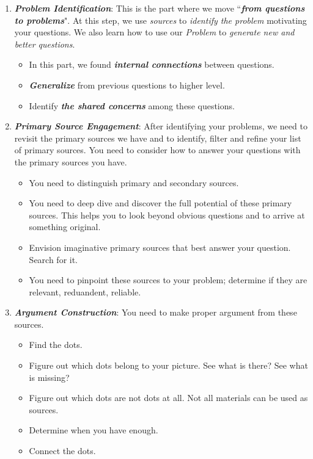 \documentclass[11pt]{article}
\begin{document}
\begin{itemize}
\begin{enumerate}
\item \emph{\textbf{Problem Identification}}: This is the part where we move ``\emph{\textbf{from questions to problems}}". At this step, we use \emph{sources} to \emph{identify the problem} motivating your questions. We also learn how to use our \emph{Problem} to \emph{generate new and better
questions}.
\begin{itemize}
\item In this part, we found \emph{\textbf{internal connections}} between questions. 

\item  \emph{\textbf{Generalize}} from previous questions to higher level.

\item Identify \emph{\textbf{the shared concerns}} among these questions.
\end{itemize}

\item \emph{\textbf{Primary Source Engagement}}: After identifying your problems, we need to revisit the primary sources we have and to identify, filter and refine your list of primary sources. You need to consider how to answer your questions with the primary sources you have. 
\begin{itemize}
\item You need to distinguish primary and secondary sources.
\item You need to deep dive and discover the full potential of these primary sources.  This helps you to look beyond obvious questions and to arrive at something original.
\item Envision imaginative primary sources that best answer your question. Search for it.
\item You need to pinpoint these sources to your problem; determine if they are relevant, reduandent, reliable. 
\end{itemize}

\item \emph{\textbf{Argument Construction}}: You need to make proper argument from these sources. 
\begin{itemize}
\item Find the dots. 
\item Figure out which dots belong to your picture. See what is there? See what is missing? 
\item Figure out which dots are not dots at all. Not all materials can be used as sources. 
\item Determine when you have enough.
\item Connect the dots. 
\end{itemize}


\end{enumerate}
\end{itemize}
\end{document}
